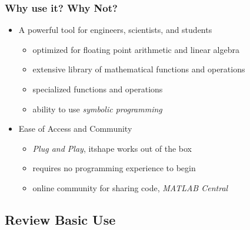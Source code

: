 \documentclass[fleqn]{ltx-talk} %
\newcommand{\sectionIIsubsectionIItitle}{Why use it? Why Not?}
\newcommand{\sectionIIsubsectionIIItitle}{Review Basic Use}
\begin{document}
			\begin{frame}
				\frametitle{\sectionIIsubsectionIItitle}

								\begin{itemize}
					\item A powerful tool for engineers, scientists, and students
					\begin{itemize}	
						\item  optimized for floating point arithmetic and linear algebra
						\item extensive library of mathematical functions and operations 
						\item specialized functions and operations
						\begin{itemize}
						\end{itemize}
						\item ability to use {\itshape symbolic programming }	
					\end{itemize}
					
					\item Ease of Access and Community
					\begin{itemize}
						\item {\itshape Plug and Play}, itshape works out of the box
						\item requires no programming experience to begin
						\item online community for sharing code,  {\itshape MATLAB Central}
					\end{itemize}
				\end{itemize}
				

				\btVFill 
			\end{frame}	

		\subsection{\sectionIIsubsectionIIItitle}\label{sectionIIsubsectionIII}
\end{document}
